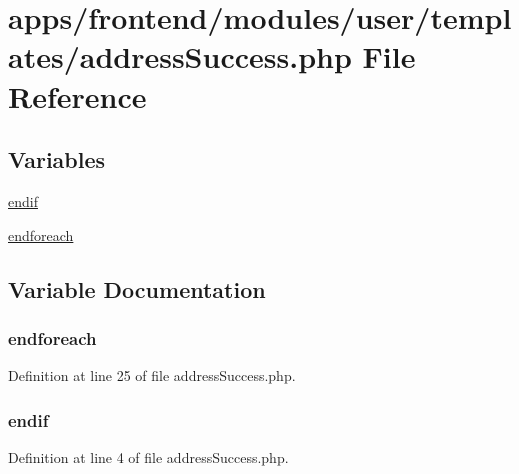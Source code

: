 \hypertarget{address_success_8php}{\section{apps/frontend/modules/user/templates/address\-Success.php File Reference}
\label{address_success_8php}
}
\subsection*{Variables}
\begin{DoxyCompactItemize}
\item 
\hyperlink{address_success_8php_a82cd33ca97ff99f2fcc5e9c81d65251b}{endif}
\item 
\hyperlink{address_success_8php_a672d9707ef91db026c210f98cc601123}{endforeach}
\end{DoxyCompactItemize}


\subsection{Variable Documentation}
\hypertarget{address_success_8php_a672d9707ef91db026c210f98cc601123}{
\subsubsection[{endforeach}]{\setlength{\rightskip}{0pt plus 5cm}endforeach}}\label{address_success_8php_a672d9707ef91db026c210f98cc601123}


Definition at line 25 of file address\-Success.\-php.

\hypertarget{address_success_8php_a82cd33ca97ff99f2fcc5e9c81d65251b}{
\subsubsection[{endif}]{\setlength{\rightskip}{0pt plus 5cm}endif}}\label{address_success_8php_a82cd33ca97ff99f2fcc5e9c81d65251b}


Definition at line 4 of file address\-Success.\-php.

